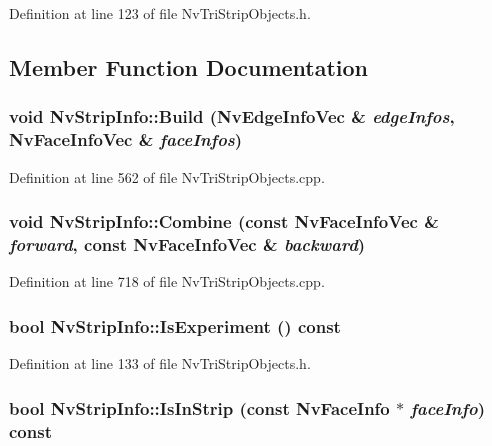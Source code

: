 Definition at line 123 of file NvTriStripObjects.h.

\subsection{Member Function Documentation}
\hypertarget{class_nv_strip_info_af6dc94b04e07e3d404a23e829cfadeb}{
\subsubsection[{Build}]{\setlength{\rightskip}{0pt plus 5cm}void NvStripInfo::Build ({\bf NvEdgeInfoVec} \& {\em edgeInfos}, \/  {\bf NvFaceInfoVec} \& {\em faceInfos})}}
\label{class_nv_strip_info_af6dc94b04e07e3d404a23e829cfadeb}




Definition at line 562 of file NvTriStripObjects.cpp.\hypertarget{class_nv_strip_info_3944545c70cac884f64248b8f100ec0a}{
\subsubsection[{Combine}]{\setlength{\rightskip}{0pt plus 5cm}void NvStripInfo::Combine (const {\bf NvFaceInfoVec} \& {\em forward}, \/  const {\bf NvFaceInfoVec} \& {\em backward})}}
\label{class_nv_strip_info_3944545c70cac884f64248b8f100ec0a}




Definition at line 718 of file NvTriStripObjects.cpp.\hypertarget{class_nv_strip_info_f6c1f7debc45a19d3025231bc8ea7dd8}{
\subsubsection[{IsExperiment}]{\setlength{\rightskip}{0pt plus 5cm}bool NvStripInfo::IsExperiment () const}}
\label{class_nv_strip_info_f6c1f7debc45a19d3025231bc8ea7dd8}




Definition at line 133 of file NvTriStripObjects.h.\hypertarget{class_nv_strip_info_702a14b14312b436f64d481623e67615}{
\subsubsection[{IsInStrip}]{\setlength{\rightskip}{0pt plus 5cm}bool NvStripInfo::IsInStrip (const {\bf NvFaceInfo} $\ast$ {\em faceInfo}) const}}
\label{class_nv_strip_info_702a14b14312b436f64d481623e67615}




